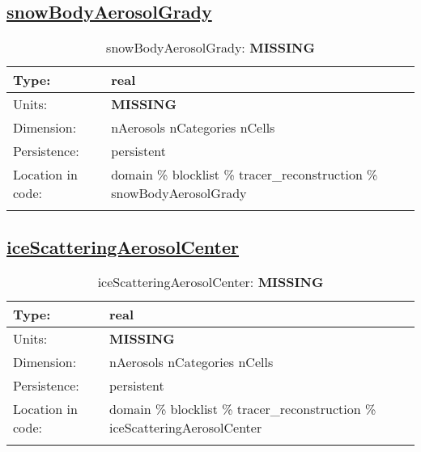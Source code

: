 \subsection[snowBodyAerosolGrady]{\hyperref[sec:var_tab_tracer_reconstruction]{snowBodyAerosolGrady}}
\label{subsec:var_sec_tracer_reconstruction_snowBodyAerosolGrady}
\begin{center}
\begin{longtable}{| p{2.0in} | p{4.0in} |}
        \hline 
        Type: & real \\
        \hline 
        Units: & {\bf \color{red} MISSING} \\
        \hline 
        Dimension: & nAerosols nCategories nCells \\
        \hline 
        Persistence: & persistent \\
        \hline 
         Location in code: & domain \% blocklist \% tracer\_reconstruction \% snowBodyAerosolGrady \\
         \hline 
    \caption{snowBodyAerosolGrady: {\bf \color{red} MISSING}}
\end{longtable}
\end{center}
\subsection[iceScatteringAerosolCenter]{\hyperref[sec:var_tab_tracer_reconstruction]{iceScatteringAerosolCenter}}
\label{subsec:var_sec_tracer_reconstruction_iceScatteringAerosolCenter}
\begin{center}
\begin{longtable}{| p{2.0in} | p{4.0in} |}
        \hline 
        Type: & real \\
        \hline 
        Units: & {\bf \color{red} MISSING} \\
        \hline 
        Dimension: & nAerosols nCategories nCells \\
        \hline 
        Persistence: & persistent \\
        \hline 
         Location in code: & domain \% blocklist \% tracer\_reconstruction \% iceScatteringAerosolCenter \\
         \hline 
    \caption{iceScatteringAerosolCenter: {\bf \color{red} MISSING}}
\end{longtable}
\end{center}

